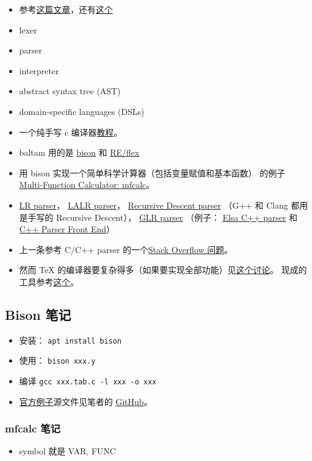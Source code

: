 
\begin{issues}
\issueDraft
\end{issues}

\begin{itemize}
\item 参考\href{https://www.toptal.com/scala/writing-an-interpreter}{这篇文章}，还有\href{https://www.youtube.com/watch?v=Xu4RtLlm42I}{这个}
\item lexer
\item parser
\item interpreter
\item abstract syntax tree (AST)
\item domain-specific languages (DSLs)
\item 一个纯手写 c 编译器\href{https://norasandler.com/2017/11/29/Write-a-Compiler.html}{教程}。
\item baltam 用的是 \href{https://www.gnu.org/software/bison/}{bison} 和 \href{https://www.genivia.com/doc/reflex/html/}{RE/flex}
\item 用 bison 实现一个简单科学计算器（包括变量赋值和基本函数） 的例子 \href{http://web.mit.edu/gnu/doc/html/bison_5.html}{Multi-Function Calculator: mfcalc}。
\item \href{https://en.wikipedia.org/wiki/LR_parser}{LR parser}， \href{https://en.wikipedia.org/wiki/LALR_parser}{LALR parser}， \href{https://en.wikipedia.org/wiki/Recursive_descent_parser}{Recursive Descent parser} （G++ 和 Clang 都用是手写的 Recursive Descent）， \href{https://en.wikipedia.org/wiki/GLR_parser}{GLR parser} （例子： \href{http://www.scottmcpeak.com/elkhound/}{Elsa C++ parser} 和 \href{http://www.semanticdesigns.com/Products/FrontEnds/CppFrontEnd.html}{C++ Parser Front End}）
\item 上一条参考 C/C++ parser 的一个\href{https://stackoverflow.com/questions/6319086/are-gcc-and-clang-parsers-really-handwritten}{Stack Overflow 问题}。
\item 然而 TeX 的编译器要复杂得多（如果要实现全部功能）见\href{https://groups.google.com/g/comp.text.tex/c/E1736iEOxNI}{这个讨论}。 现成的工具参考\href{https://tex.stackexchange.com/questions/39309/convert-latex-to-html}{这个}。
\end{itemize}

\subsection{Bison 笔记}
\begin{itemize}
\item 安装： \verb|apt install bison|
\item 使用： \verb|bison xxx.y|
\item 编译 \verb|gcc xxx.tab.c -l xxx -o xxx|
\item \href{http://web.mit.edu/gnu/doc/html/bison_5.html}{官方例子}源文件见笔者的 \href{https://github.com/MacroUniverse/bison_test}{GitHub}。
\end{itemize}

\subsubsection{mfcalc 笔记}
\begin{itemize}
\item symbol 就是 VAR, FUNC
\end{itemize}
